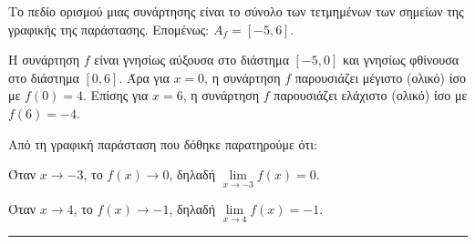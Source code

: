 \begin{alist}
\item Το πεδίο ορισμού μιας συνάρτησης είναι το σύνολο των τετμημένων των σημείων της γραφικής της παράστασης. Επομένως: $A_f = [-5, 6]$.

\item Η συνάρτηση $f$ είναι γνησίως αύξουσα στο διάστημα $[-5, 0]$ και γνησίως φθίνουσα στο διάστημα $[0, 6]$. Άρα για $x = 0$, η συνάρτηση $f$ παρουσιάζει μέγιστο (ολικό) ίσο με $f(0) = 4$. Επίσης για $x = 6$, η συνάρτηση $f$ παρουσιάζει ελάχιστο (ολικό) ίσο με $f(6) = -4$.
\item Από τη γραφική παράσταση που δόθηκε παρατηρούμε ότι:

Όταν $x \to -3$, το $f(x) \to 0$, δηλαδή $\lim\limits_{x \to -3} f(x) = 0$.

Όταν $x \to 4$, το $f(x) \to -1$, δηλαδή $\lim\limits_{x \to 4} f(x) = -1$.

\end{alist}
\vspace{6mm}
\noindent\rule{\textwidth}{0.4pt}
\vspace{6mm}


